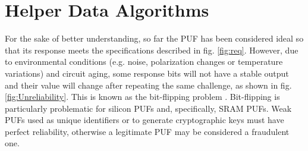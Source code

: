 








\section{Helper Data Algorithms} 
\label{sec:HDAs}

For the sake of better understanding, so far the PUF has been considered ideal so that its response meets the specifications described in fig. \ref{fig:req}. However, due to environmental conditions (e.g. noise, polarization changes or temperature variations) and circuit aging, some response bits will not have a stable output and their value will change after repeating the same challenge, as shown in fig. \ref{fig:Unreliability}. This is known as the bit-flipping problem \cite{Baturone2015,Bhargava2012,Eiroa2012}. Bit-flipping is particularly problematic for silicon PUFs and, specifically, SRAM PUFs. Weak PUFs used as unique identifiers or to generate cryptographic keys must have perfect reliability, otherwise a legitimate PUF may be considered a fraudulent one. 



